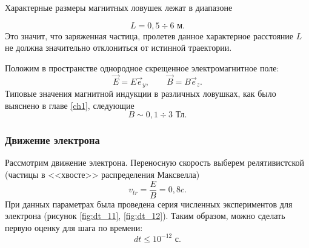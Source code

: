 Характерные размеры магнитных ловушек лежат в диапазоне \cite{dimov2005}

\begin{equation}
L = 0,5 \div 6 \text{ м.}
\end{equation}
Это значит, что заряженная частица, пролетев данное характерное расстояние $L$ не должна значительно отклониться от истинной траектории.


Положим в пространстве однородное скрещенное электромагнитное поле:
\begin{equation}
\vec{E} = E  \vec{e}_y, \qquad \vec{B} = B  \vec{e}_z.
\end{equation}
Типовые значения магнитной индукции в различных ловушках, как было выяснено в главе \ref{ch1}, следующие
\begin{equation}
B \sim 0,1 \div 3 \text{ Тл}.
\end{equation}

\subsubsection{Движение электрона}

Рассмотрим движение электрона. Переносную скорость выберем релятивистской (частицы в <<хвосте>> распределения Максвелла)
\begin{equation}
v_{tr} = \frac{E}{B} = 0,8c.
\end{equation}
При данных параметрах была проведена серия численных экспериментов для электрона (рисунок \ref{fig:dt_11}, \ref{fig:dt_12}). Таким образом, можно сделать первую оценку для шага по времени:
\begin{equation}
dt \leqslant 10^{-12} \text{ с}.
\end{equation}


